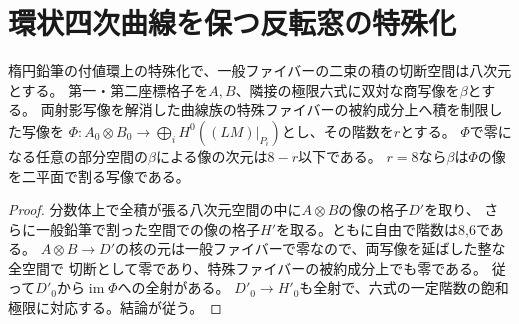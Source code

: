 \section{環状四次曲線を保つ反転窓の特殊化}
\label{sec:polygon-apolar-limits}
\begin{lemma}[特殊ファイバーの積と極限の六式]\label{lem:mixed-rank-loss}
楕円鉛筆の付値環上の特殊化で、一般ファイバーの二束の積の切断空間は八次元とする。
第一・第二座標格子を$A,B$、隣接の極限六式に双対な商写像を$\beta$とする。
両射影写像を解消した曲線族の特殊ファイバーの被約成分上へ積を制限した写像を
$\Phi:A_0\otimes B_0\to\bigoplus_i H^0((LM)|_{P_i})$とし、その階数を$r$とする。
$\Phi$で零になる任意の部分空間の$\beta$による像の次元は$8-r$以下である。
$r=8$なら$\beta$は$\Phi$の像を二平面で割る写像である。
\end{lemma}
\begin{proof}
分数体上で全積が張る八次元空間の中に$A\otimes B$の像の格子$D'$を取り、
さらに一般鉛筆で割った空間での像の格子$H'$を取る。ともに自由で階数は8,6である。
$A\otimes B\to D'$の核の元は一般ファイバーで零なので、両写像を延ばした整な全空間で
切断として零であり、特殊ファイバーの被約成分上でも零である。
従って$D'_0$から$\operatorname{im}\Phi$への全射がある。
$D'_0\to H'_0$も全射で、六式の一定階数の飽和極限に対応する。結論が従う。
\end{proof}

